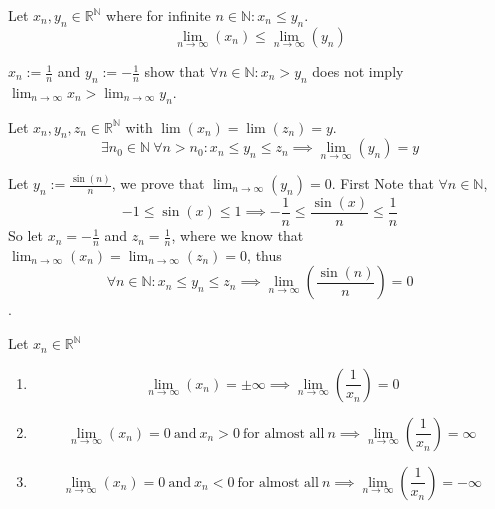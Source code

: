 \begin{proposition}\label{pro:limit_comp}
   Let \(x_n, y_n \in \mathbb{R}^\mathbb{N}\) where for infinite \(n \in \mathbb{N}: x_n \leq y_n\).
   \[\lim_{n \to \infty}(x_n) \leq \lim_{n \to \infty}(y_n)\]
\end{proposition}
\begin{remark}
   \(x_n := \frac{1}{n}\) and \(y_n := -\frac{1}{n}\) show that \(\forall n \in \mathbb{N}: x_n > y_n\) does not imply \(\lim_{n \to \infty} x_n > \lim_{n \to \infty} y_n\).
\end{remark}

\begin{proposition}\label{pro:sandwich_seq}
   Let \(x_n, y_n, z_n \in \mathbb{R}^\mathbb{N}\) with \(\lim(x_n) = \lim(z_n) = y\).
   \[\exists n_0 \in \mathbb{N}~\forall n > n_0: x_n \leq y_n \leq z_n \implies \lim_{n \to \infty}(y_n) = y\]
\end{proposition}
\begin{example}
   Let \(y_n := \frac{\sin(n)}{n}\), we prove that \(\lim_{n \to \infty}(y_n) = 0\).
   First Note that \(\forall n \in \mathbb{N}\),
   \[-1 \leq \sin(x) \leq 1 \implies -\frac{1}{n} \leq \frac{\sin(x)}{n} \leq \frac{1}{n}\]
   So let \(x_n = -\frac{1}{n}\) and \(z_n = \frac{1}{n}\), where we know that \(\lim_{n \to \infty}(x_n) = \lim_{n \to \infty}(z_n) = 0\), thus
   \[\forall n \in \mathbb{N}: x_n \leq y_n \leq z_n \implies \lim_{n \to \infty}\left(\frac{\sin(n)}{n}\right) = 0\].
\end{example}

\begin{theorem}
   Let \(x_n \in \mathbb{R}^\mathbb{N}\)
   \begin{enumerate}[label=\roman*, align=Center]
      \item \[\lim_{n \to \infty}(x_n) = \pm\infty \implies \lim_{n \to \infty}\left(\frac{1}{x_n}\right) = 0\]
      \item \[\lim_{n \to \infty}(x_n) = 0~\text{and}~x_n > 0~\text{for almost all}~n \implies \lim_{n \to \infty}\left(\frac{1}{x_n}\right) = \infty\]
      \item \[\lim_{n \to \infty}(x_n) = 0~\text{and}~x_n < 0~\text{for almost all}~n \implies \lim_{n \to \infty}\left(\frac{1}{x_n}\right) = -\infty\]
   \end{enumerate}
\end{theorem}

\newpage

